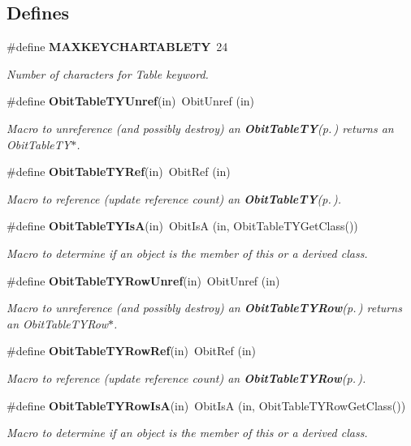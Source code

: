\subsection*{Defines}
\begin{CompactItemize}
\item 
\#define {\bf MAXKEYCHARTABLETY}\ 24
\begin{CompactList}\small\item\em Number of characters for Table keyword. \item\end{CompactList}\item 
\#define {\bf Obit\-Table\-TYUnref}(in)\ Obit\-Unref (in)
\begin{CompactList}\small\item\em Macro to unreference (and possibly destroy) an {\bf Obit\-Table\-TY}{\rm (p.\,\pageref{structObitTableTY})} returns an Obit\-Table\-TY$\ast$. \item\end{CompactList}\item 
\#define {\bf Obit\-Table\-TYRef}(in)\ Obit\-Ref (in)
\begin{CompactList}\small\item\em Macro to reference (update reference count) an {\bf Obit\-Table\-TY}{\rm (p.\,\pageref{structObitTableTY})}. \item\end{CompactList}\item 
\#define {\bf Obit\-Table\-TYIs\-A}(in)\ Obit\-Is\-A (in, Obit\-Table\-TYGet\-Class())
\begin{CompactList}\small\item\em Macro to determine if an object is the member of this or a derived class. \item\end{CompactList}\item 
\#define {\bf Obit\-Table\-TYRow\-Unref}(in)\ Obit\-Unref (in)
\begin{CompactList}\small\item\em Macro to unreference (and possibly destroy) an {\bf Obit\-Table\-TYRow}{\rm (p.\,\pageref{structObitTableTYRow})} returns an Obit\-Table\-TYRow$\ast$. \item\end{CompactList}\item 
\#define {\bf Obit\-Table\-TYRow\-Ref}(in)\ Obit\-Ref (in)
\begin{CompactList}\small\item\em Macro to reference (update reference count) an {\bf Obit\-Table\-TYRow}{\rm (p.\,\pageref{structObitTableTYRow})}. \item\end{CompactList}\item 
\#define {\bf Obit\-Table\-TYRow\-Is\-A}(in)\ Obit\-Is\-A (in, Obit\-Table\-TYRow\-Get\-Class())
\begin{CompactList}\small\item\em Macro to determine if an object is the member of this or a derived class. \item\end{CompactList}\end{CompactItemize}
